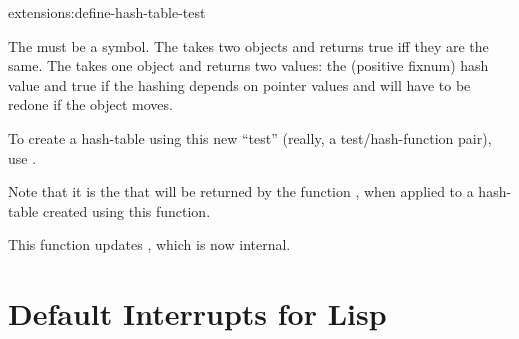 \begin{defun}{extensions:}{define-hash-table-test}%
  {}
      
      The  must be a symbol.
      The  takes two objects and returns true
      iff they are the same.  The  takes one object and
      returns two values: the (positive fixnum) hash value and true if
      the hashing depends on pointer values and will have to be redone
      if the object moves.
      
      To create a hash-table using this new ``test'' (really, a
      test/hash-function pair), use
      .

      Note that it is the  that will be
      returned by the function , when applied to
      a hash-table created using this function.

      This function updates , which is now
      internal.  
\end{defun}




\section{Default Interrupts for Lisp}

